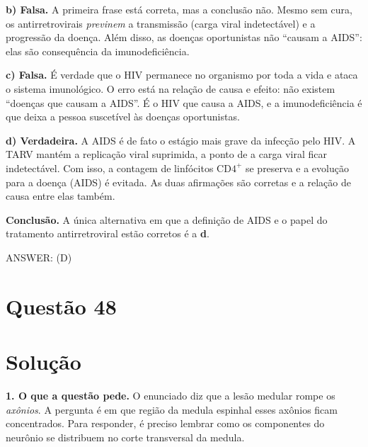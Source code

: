 \documentclass{article}%
\begin{document}
\textbf{b) Falsa.} A primeira frase está correta, mas a conclusão não. Mesmo sem cura, os antirretrovirais \emph{previnem} a transmissão (carga viral indetectável) e a progressão da doença. Além disso, as doenças oportunistas não ``causam a AIDS'': elas são consequência da imunodeficiência.

\textbf{c) Falsa.} É verdade que o HIV permanece no organismo por toda a vida e ataca o sistema imunológico. O erro está na relação de causa e efeito: não existem ``doenças que causam a AIDS''. É o HIV que causa a AIDS, e a imunodeficiência é que deixa a pessoa suscetível às doenças oportunistas.

\textbf{d) Verdadeira.} A AIDS é de fato o estágio mais grave da infecção pelo HIV. A TARV mantém a replicação viral suprimida, a ponto de a carga viral ficar indetectável. Com isso, a contagem de linfócitos $\text{CD4}^{+}$ se preserva e a evolução para a doença (AIDS) é evitada. As duas afirmações são corretas e a relação de causa entre elas também.

\textbf{Conclusão.} A única alternativa em que a definição de AIDS e o papel do tratamento antirretroviral estão corretos é a \textbf{d}.

\medskip
ANSWER: (D)%
\newpage%
\section*{Questão 48}

\section*{Solução}

\textbf{1. O que a questão pede.} O enunciado diz que a lesão medular rompe os \emph{axônios}. A pergunta é em que região da medula espinhal esses axônios ficam concentrados. Para responder, é preciso lembrar como os componentes do neurônio se distribuem no corte transversal da medula.
\end{document}
